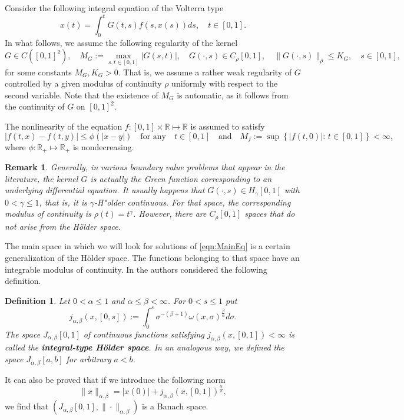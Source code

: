 \documentclass[12pt,a4paper]{article}
\newtheorem{rem}{Remark}
\newtheorem{df}{Definition}
\begin{document}
Consider the following integral equation of the Volterra type
\begin{equation}\label{eqn:MainEq}
	x(t) = \int_0^t G(t,s) f(s, x(s)) ds, \quad t \in[0,1].
\end{equation}
In what follows, we assume the following regularity of the kernel
\begin{equation}\label{eqn:AssumG}
	\tag{H1}
	G \in C([0,1]^2), \quad M_G := \max_{s,t\in[0,1]} |G(s,t)|, \quad G(\cdot, s) \in C_\rho[0,1], \quad \|G(\cdot, s)\|_\rho \leq K_G, \quad s \in [0,1],
\end{equation}
for some constants $M_G, K_G > 0$. That is, we assume a rather weak regularity of $G$ controlled by a given modulus of continuity $\rho$ uniformly with respect to the second variable. Note that the existence of $M_G$ is automatic, as it follows from the continuity of $G$ on $[0,1]^2$. 

The nonlinearity of the equation $f: [0,1]\times\mathbb{R} \mapsto \mathbb{R}$ is assumed to satisfy
\begin{equation}\label{eqn:AssumF}
	\tag{H2}
	|f(t,x) - f(t, y)| \leq \phi(|x-y|) \quad \text{for any} \quad t \in [0,1] \quad \text{and}\quad M_f := \sup\left\{|f(t,0)|: \, t\in[0,1]\right\} < \infty,
\end{equation}
where $\phi: \mathbb{R}_+ \mapsto \mathbb{R}_+$ is nondecreasing. 

\begin{rem}
	Generally, in various boundary value problems that appear in the literature, the kernel $G$ is actually the Green function corresponding to an underlying differential equation. It usually happens that $G(\cdot, s) \in H_\gamma[0,1]$ with $0<\gamma\leq 1$, that is, it is $\gamma$-H"older continuous. For that space, the corresponding modulus of continuity is $\rho(t) = t^\gamma$. However, there are $C_\rho[0,1]$ spaces that do not arise from the H\"older space.
\end{rem}

The main space in which we will look for solutions of \eqref{eqn:MainEq} is a certain generalization of the H\"older space. The functions belonging to that space have an integrable modulus of continuity. In \cite{appell2021holder,appell1987application} the authors considered the following definition.
\begin{df}
	Let $0<\alpha\leq 1$ and $\alpha \leq \beta < \infty$. For $0<s\leq 1$ put
	\begin{equation}
		j_{\alpha,\beta}(x, [0,s]) := \int_0^s \sigma^{-(\beta+1)} \omega(x, \sigma)^\frac{\beta}{\alpha} d\sigma.
	\end{equation}
	The space $J_{\alpha,\beta}[0,1]$ of continuous functions satisfying $j_{\alpha,\beta}(x, [0,1]) < \infty$ is called the \textbf{integral-type H\"older space}. In an analogous way, we defined the space $J_{\alpha,\beta}[a,b]$ for arbitrary $a<b$. 
\end{df}
\noindent It can also be proved that if we introduce the following norm
\begin{equation}
	\|x\|_{\alpha, \beta} = |x(0)| + j_{\alpha,\beta} (x, [0,1])^\frac{\alpha}{\beta},
\end{equation} 
we find that $(J_{\alpha,\beta}[0,1], \|\cdot\|_{\alpha,\beta})$ is a Banach space. 
\end{document}

